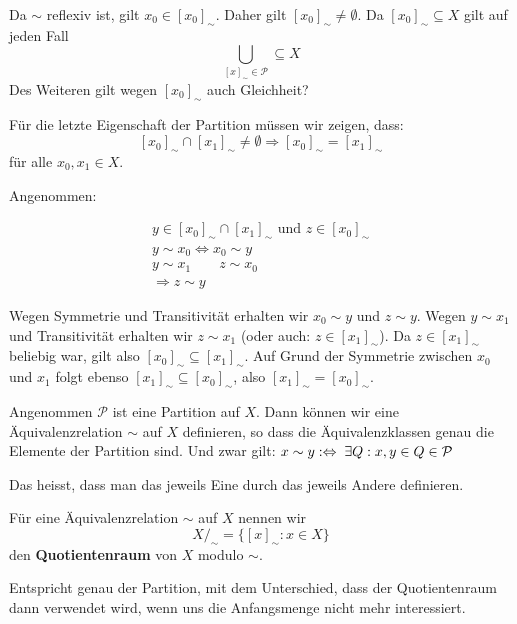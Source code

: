 \documentclass[main.tex]{subfiles}
\begin{document}
\begin{Beweis}
  Da $\sim$ reflexiv ist, gilt $x_0 \in [x_0]_\sim$. Daher gilt $[x_0]_\sim \neq \emptyset$.
  Da $[x_0]_\sim \subseteq X$ gilt auf jeden Fall
  $$\bigcup_{[x]_\sim \in \mathcal{P}} \subseteq X $$
  Des Weiteren gilt wegen $[x_0]_\sim$ auch Gleichheit?

  Für die letzte Eigenschaft der Partition müssen wir zeigen, dass:
  $$[x_0]_\sim \cap [x_1]_\sim \neq \emptyset \Rightarrow [x_0]_\sim = [x_1]_\sim$$
  für alle $x_0,x_1 \in X$.

  Angenommen:
  \begin{center}
    \begin{gather*}
      y \in [x_0]_\sim \cap [x_1]_\sim \text{ und } z \in [x_0]_\sim \\
      y \sim x_0 \Leftrightarrow x_0 \sim y \qquad \quad \\
      y \sim x_1 \qquad z \sim x_0 \\
      \Rightarrow z \sim y
    \end{gather*}
  \end{center}
  Wegen Symmetrie und Transitivität erhalten wir $x_0 \sim y $ und $z\sim y$. Wegen $y\sim x_1$ und Transitivität erhalten wir $z \sim x_1$ (oder auch: $z \in [x_1]_\sim$). Da $z \in [x_1]_\sim$ beliebig war, gilt also $[x_0]_\sim \subseteq [x_1]_\sim$. Auf Grund der Symmetrie zwischen $x_0$ und $x_1$ folgt ebenso $[x_1]_\sim \subseteq [x_0]_\sim$, also $[x_1]_\sim = [x_0]_\sim$.
\end{Beweis}

\begin{Theorem}
  Angenommen $\mathcal{P}$ ist eine Partition auf $X$. Dann können wir eine Äquivalenzrelation $\sim$ auf $X$ definieren, so dass die Äquivalenzklassen genau die Elemente der Partition sind. Und zwar gilt: $x \sim y :\Leftrightarrow \;\exists Q: x,y \in Q \in \mathcal{P}$
\end{Theorem}

\begin{Bemerkung}
  Das heisst, dass man das jeweils Eine durch das jeweils Andere definieren.
\end{Bemerkung}

\begin{Definition}[Quotientenraum]
  Für eine Äquivalenzrelation $\sim$ auf $X$ nennen wir $$X/_\sim = \{[x]_\sim : x \in X \}$$
  den \textbf{Quotientenraum} von $X$ modulo $\sim$.
\end{Definition}

\begin{Bemerkung}
  Entspricht genau der Partition, mit dem Unterschied, dass der Quotientenraum dann verwendet wird, wenn uns die Anfangsmenge nicht mehr interessiert.
\end{Bemerkung}
\end{document}
